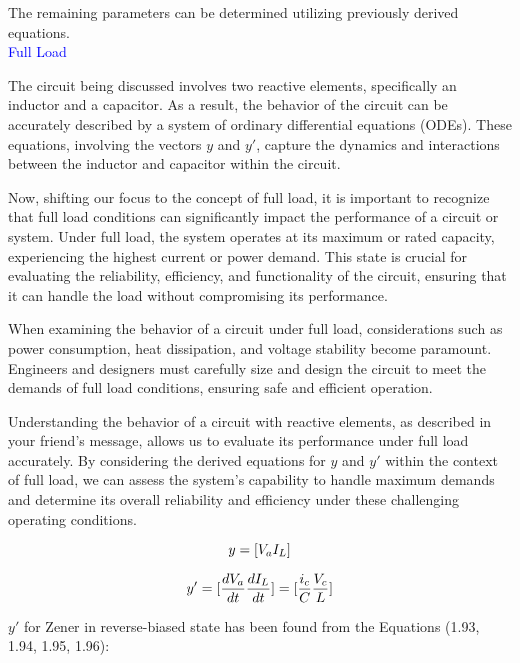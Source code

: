 The remaining parameters can be determined utilizing previously derived equations.\\

\Large\textcolor{blue}{Full Load}

The circuit being discussed involves two reactive elements, specifically an inductor and a capacitor. As a result, the behavior of the circuit can be accurately described by a system of ordinary differential equations (ODEs). These equations, involving the vectors $y$ and $y'$, capture the dynamics and interactions between the inductor and capacitor within the circuit.

Now, shifting our focus to the concept of full load, it is important to recognize that full load conditions can significantly impact the performance of a circuit or system. Under full load, the system operates at its maximum or rated capacity, experiencing the highest current or power demand. This state is crucial for evaluating the reliability, efficiency, and functionality of the circuit, ensuring that it can handle the load without compromising its performance.

When examining the behavior of a circuit under full load, considerations such as power consumption, heat dissipation, and voltage stability become paramount. Engineers and designers must carefully size and design the circuit to meet the demands of full load conditions, ensuring safe and efficient operation.

Understanding the behavior of a circuit with reactive elements, as described in your friend's message, allows us to evaluate its performance under full load accurately. By considering the derived equations for $y$ and $y'$ within the context of full load, we can assess the system's capability to handle maximum demands and determine its overall reliability and efficiency under these challenging operating conditions.

\begin{equation}
    y=[V_a\\
    I_L]
\end{equation}

\begin{equation}
    y'=[\frac{dV_a}{dt}\\
    \frac{dI_L}{dt}]=[\frac{i_c}{C}\\
    \frac{V_c}{L}]\\
\end{equation}


$y'$ for Zener in reverse-biased state has been found from the Equations (1.93, 1.94, 1.95, 1.96):\\

